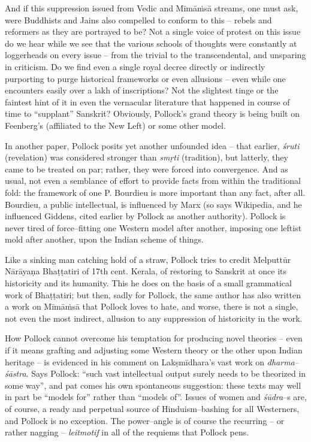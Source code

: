 And if this suppression issued from Vedic and Mīmāṁsā streams, one must ask, were Buddhists and Jains also compelled to conform to this – rebels and reformers as they are portrayed to be? Not a single voice of protest on this issue do we hear while we see that the various schools of thoughts were constantly at loggerheads on every issue – from the trivial to the transcendental, and unsparing in criticism. Do we find even a single royal decree directly or indirectly purporting to purge historical frameworks or even allusions – even while one encounters easily over a lakh of inscriptions? Not the slightest tinge or the faintest hint of it in even the vernacular literature that happened in course of time to “supplant” Sanskrit? Obviously, Pollock’s grand theory is being built on Feenberg’s (affiliated to the New Left) or some other model.

In another paper, Pollock posits yet another unfounded idea – that earlier, \textit{śruti} (revelation) was considered stronger than \textit{smṛti} (tradition), but latterly, they came to be treated on par; rather, they were forced into convergence. And as usual, not even a semblance of effort to provide facts from within the traditional fold: the framework of one P. Bourdieu is more important than any fact, after all. Bourdieu, a public intellectual, is influenced by Marx (so says Wikipedia, and he influenced Giddens, cited earlier by Pollock as another authority). Pollock is never tired of force–fitting one Western model after another, imposing one leftist mold after another, upon the Indian scheme of things.

Like a sinking man catching hold of a straw, Pollock tries to credit Melputtūr Nārāyaṇa Bhaṭṭatiri of 17th cent. Kerala, of restoring to Sanskrit at once its historicity and its humanity. This he does on the basis of a small grammatical work of Bhaṭṭatiri; but then, sadly for Pollock, the same author has also written a work on Mīmāṁsā that Pollock loves to hate, and worse, there is not a single, not even the most indirect, allusion to any suppression of historicity in the work.

How Pollock cannot overcome his temptation for producing novel theories – even if it means grafting and adjusting some Western theory or the other upon Indian heritage – is evidenced in his comment on Lakṣmīdhara’s vast work on \textit{dharma–śāstra}. Says Pollock: “such vast intellectual output surely needs to be theorized in some way”, and pat comes his own spontaneous suggestion: these texts may well in part be “models for” rather than “models of”. Issues of women and \textit{śūdra}–s are, of course, a ready and perpetual source of Hinduism–bashing for all Westerners, and Pollock is no exception. The power–angle is of course the recurring – or rather nagging – \textit{leitmotif} in all of the requiems that Pollock pens.

